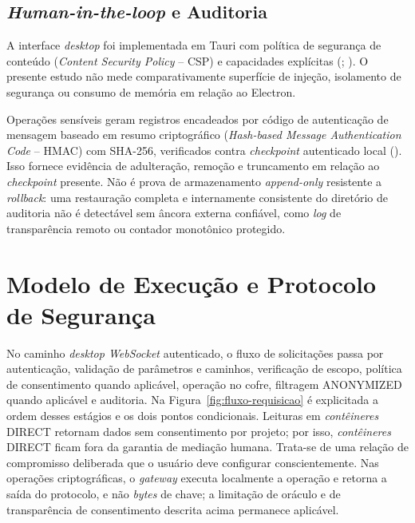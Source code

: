 \subsection{\textit{Human-in-the-loop} e Auditoria}
A interface \textit{desktop} foi implementada em Tauri com política de segurança de conteúdo (\textit{Content Security Policy} -- CSP) e capacidades explícitas (; ). O presente estudo não mede comparativamente superfície de injeção, isolamento de segurança ou consumo de memória em relação ao Electron.

Operações sensíveis geram registros encadeados por código de autenticação de mensagem baseado em resumo criptográfico (\textit{Hash-based Message Authentication Code} -- HMAC) com SHA-256, verificados contra \textit{checkpoint} autenticado local (). Isso fornece evidência de adulteração, remoção e truncamento em relação ao \textit{checkpoint} presente. Não é prova de armazenamento \textit{append-only} resistente a \textit{rollback}: uma restauração completa e internamente consistente do diretório de auditoria não é detectável sem âncora externa confiável, como \textit{log} de transparência remoto ou contador monotônico protegido.

\section{Modelo de Execução e Protocolo de Segurança}
No caminho \textit{desktop WebSocket} autenticado, o fluxo de solicitações passa por autenticação, validação de parâmetros e caminhos, verificação de escopo, política de consentimento quando aplicável, operação no cofre, filtragem ANONYMIZED quando aplicável e auditoria. Na Figura~\ref{fig:fluxo-requisicao} é explicitada a ordem desses estágios e os dois pontos condicionais. Leituras em \textit{contêineres} DIRECT retornam dados sem consentimento por projeto; por isso, \textit{contêineres} DIRECT ficam fora da garantia de mediação humana. Trata-se de uma relação de compromisso deliberada que o usuário deve configurar conscientemente. Nas operações criptográficas, o \textit{gateway} executa localmente a operação e retorna a saída do protocolo, e não \textit{bytes} de chave; a limitação de oráculo e de transparência de consentimento descrita acima permanece aplicável.

